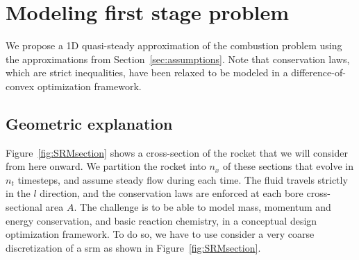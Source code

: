 \section{Modeling first stage problem}

We propose a 1D quasi-steady approximation of the combustion problem
using the approximations from Section~\ref{sec:assumptions}. Note
that conservation laws, which are strict inequalities,
have been relaxed to be modeled in a difference-of-convex
optimization framework.

\subsection{Geometric explanation}

Figure~\ref{fig:SRMsection} shows a cross-section of the rocket
that we will consider from here onward.
We partition the rocket into $n_x$ of these sections that evolve in $n_t$ timesteps,
and assume steady flow during each time. The fluid travels strictly
in the $l$ direction, and the conservation laws are enforced at
each bore cross-sectional area $A$. The challenge is to be able to model mass, momentum and energy conservation,
and basic reaction chemistry, in a conceptual design optimization framework. To do so,
we have to use consider a very coarse discretization of a \gls{srm} as shown in Figure~\ref{fig:SRMsection}.



